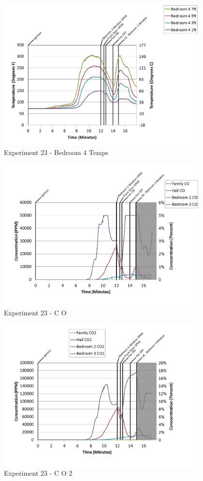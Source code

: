 \documentclass{article}
\begin{document}
\begin{appendices}
\clearpage

\begin{figure}[h!]
	\centering
	\includegraphics[height=3.05in]{0_Images/Results_Charts/Exp_23_Charts/Bedroom4Temps.png}
	\caption{Experiment 23 - Bedroom 4 Temps}
\end{figure}


\begin{figure}[h!]
	\centering
	\includegraphics[height=3.05in]{0_Images/Results_Charts/Exp_23_Charts/CO.png}
	\caption{Experiment 23 - C O}
\end{figure}

\clearpage

\begin{figure}[h!]
	\centering
	\includegraphics[height=3.05in]{0_Images/Results_Charts/Exp_23_Charts/CO2.png}
	\caption{Experiment 23 - C O 2}
\end{figure}



\end{appendices}
\end{document}
